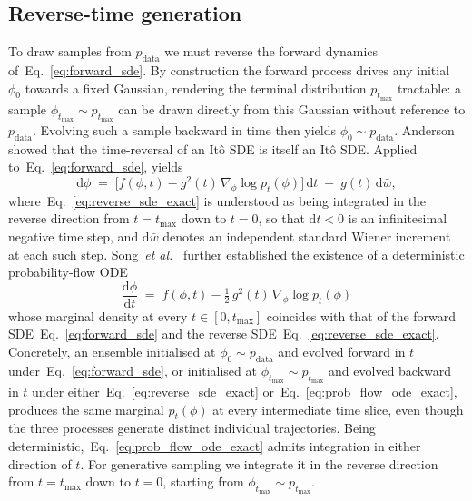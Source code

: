 \documentclass[reprint,twocolumn,superscriptaddress,preprintnumbers,amsmath,amssymb,aps,prd,floatfix]{revtex4-2}
\def\Eq#1{Eq.~\eqref{#1}}
\begin{document}
\subsection{Reverse-time generation}
\label{sec:dm_reverse}

To draw samples from $p_{\text{data}}$ we must reverse the forward dynamics of~\Eq{eq:forward_sde}. By construction the forward process drives any initial $\phi_{0}$ towards a fixed Gaussian, rendering the terminal distribution $p_{t_{\max}}$ tractable: a sample $\phi_{t_{\max}}\sim p_{t_{\max}}$ can be drawn directly from this Gaussian without reference to $p_{\text{data}}$. Evolving such a sample backward in time then yields $\phi_{0}\sim p_{\text{data}}$. Anderson~\cite{Anderson1982} showed that the time-reversal of an It\^o SDE is itself an It\^o SDE. Applied to~\Eq{eq:forward_sde}, yields~\cite{Song2021SDE}
\begin{equation}
\mathrm{d}\phi \;=\; \bigl[f(\phi,t)-g^{2}(t)\,\nabla_{\phi}\log p_{t}(\phi)\bigr]\,\mathrm{d}t \;+\; g(t)\,\mathrm{d}\bar{w},
\label{eq:reverse_sde_exact}
\end{equation}
where~\Eq{eq:reverse_sde_exact} is understood as being integrated in the reverse direction from $t=t_{\max}$ down to $t=0$, so that $\mathrm{d}t<0$ is an infinitesimal negative time step, and $\mathrm{d}\bar{w}$ denotes an independent standard Wiener increment at each such step. Song~\emph{et al.}~\cite{Song2021SDE} further established the existence of a deterministic probability-flow ODE
\begin{equation}
\frac{\mathrm{d}\phi}{\mathrm{d}t} \;=\; f(\phi,t)-\tfrac{1}{2}\,g^{2}(t)\,\nabla_{\phi}\log p_{t}(\phi)
\label{eq:prob_flow_ode_exact}
\end{equation}
whose marginal density at every $t\in[0,t_{\max}]$ coincides with that of the forward SDE~\Eq{eq:forward_sde} and the reverse SDE~\Eq{eq:reverse_sde_exact}. Concretely, an ensemble initialised at $\phi_{0}\sim p_{\text{data}}$ and evolved forward in $t$ under~\Eq{eq:forward_sde}, or initialised at $\phi_{t_{\max}}\sim p_{t_{\max}}$ and evolved backward in $t$ under either~\Eq{eq:reverse_sde_exact} or~\Eq{eq:prob_flow_ode_exact}, produces the same marginal $p_{t}(\phi)$ at every intermediate time slice, even though the three processes generate distinct individual trajectories. Being deterministic,~\Eq{eq:prob_flow_ode_exact} admits integration in either direction of $t$. For generative sampling we integrate it in the reverse direction from $t=t_{\max}$ down to $t=0$, starting from $\phi_{t_{\max}}\sim p_{t_{\max}}$.
\end{document}
